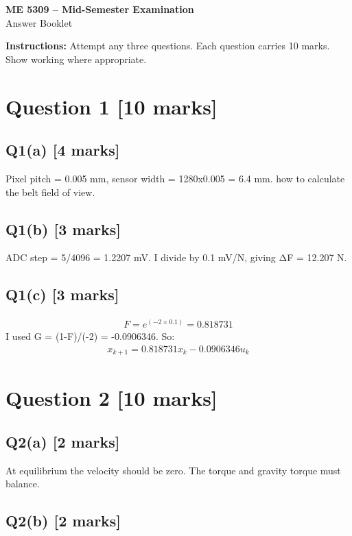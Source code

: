 \documentclass[11pt,a4paper]{article}
\begin{document}
\begin{center}
{\Large\bfseries ME 5309 -- Mid-Semester Examination}\\[3pt]
{\large Answer Booklet}\\[8pt]
\end{center}
\textbf{Instructions:} Attempt any three questions. Each question carries 10 marks. Show working where appropriate.
\section*{Question 1 \hfill [10 marks]}
\subsection*{Q1(a) \hfill [4 marks]}

Pixel pitch = 0.005 mm, sensor width = 1280x0.005 = 6.4 mm. how to calculate the belt field of view.

\subsection*{Q1(b) \hfill [3 marks]}

ADC step = 5/4096 = 1.2207 mV.
I divide by 0.1 mV/N, giving ΔF = 12.207 N.

\subsection*{Q1(c) \hfill [3 marks]}

\[\begin{aligned}F = e^(-2\times0.1) = 0.818731\end{aligned}\]
I used G = (1-F)/(-2) = -0.0906346.
So:\[\begin{aligned}x_{k+1} = 0.818731x_k - 0.0906346u_k\end{aligned}\]

\section*{Question 2 \hfill [10 marks]}
\subsection*{Q2(a) \hfill [2 marks]}

At equilibrium the velocity should be zero.
The torque and gravity torque must balance.

\subsection*{Q2(b) \hfill [2 marks]}
\end{document}
